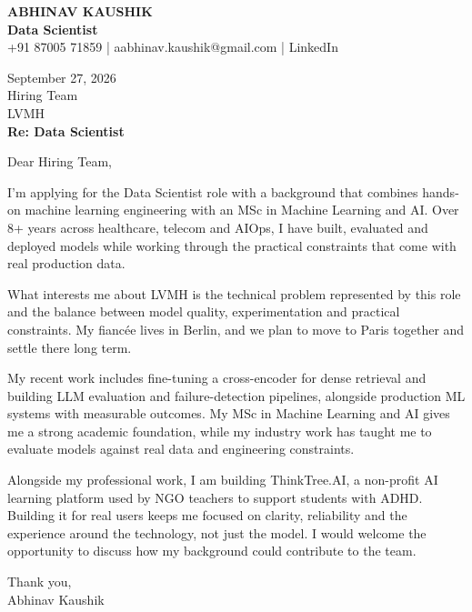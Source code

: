 \documentclass[10pt,a4paper]{article}
\begin{document}
\begin{center}
{\Large\bfseries ABHINAV KAUSHIK}\\[2pt]
{\bfseries Data Scientist}\\[2pt]
+91 87005 71859 \quad | \quad aabhinav.kaushik@gmail.com \quad | \quad LinkedIn
\end{center}
\vspace{8pt}
September 27, 2026\\[6pt]
Hiring Team\\
LVMH\\[4pt]
\textbf{Re: Data Scientist}

Dear Hiring Team,

I’m applying for the Data Scientist role with a background that combines hands-on machine learning engineering with an MSc in Machine Learning and AI. Over 8+ years across healthcare, telecom and AIOps, I have built, evaluated and deployed models while working through the practical constraints that come with real production data.

What interests me about LVMH is the technical problem represented by this role and the balance between model quality, experimentation and practical constraints. My fiancée lives in Berlin, and we plan to move to Paris together and settle there long term.

My recent work includes fine-tuning a cross-encoder for dense retrieval and building LLM evaluation and failure-detection pipelines, alongside production ML systems with measurable outcomes. My MSc in Machine Learning and AI gives me a strong academic foundation, while my industry work has taught me to evaluate models against real data and engineering constraints.

Alongside my professional work, I am building ThinkTree.AI, a non-profit AI learning platform used by NGO teachers to support students with ADHD. Building it for real users keeps me focused on clarity, reliability and the experience around the technology, not just the model. I would welcome the opportunity to discuss how my background could contribute to the team.

Thank you,\\
Abhinav Kaushik
\end{document}
